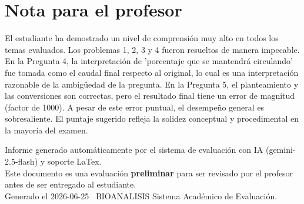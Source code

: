 \documentclass[11pt,a4paper]{article}
\begin{document}
\section*{Nota para el profesor}
\begin{tcolorbox}[
  enhanced, breakable,
  colback=yellow!8, colframe=yellow!60!black,
  fonttitle=\bfseries, coltitle=black,
  title={Observaciones para revisión manual},
  top=4pt, bottom=4pt, left=8pt, right=8pt,
]
El estudiante ha demostrado un nivel de comprensión muy alto en todos los temas evaluados. Los problemas 1, 2, 3 y 4 fueron resueltos de manera impecable. En la Pregunta 4, la interpretación de 'porcentaje que se mantendrá circulando' fue tomada como el caudal final respecto al original, lo cual es una interpretación razonable de la ambigüedad de la pregunta. En la Pregunta 5, el planteamiento y las conversiones son correctas, pero el resultado final tiene un error de magnitud (factor de 1000). A pesar de este error puntual, el desempeño general es sobresaliente. El puntaje sugerido refleja la solidez conceptual y procedimental en la mayoría del examen.
\end{tcolorbox}

\vspace{12pt}
\begin{center}
  \footnotesize\color{gray}
  Informe generado automáticamente por el sistema de evaluación con IA (gemini-2.5-flash) y soporte LaTex. \\
  Este documento es una evaluación \textbf{preliminar} para ser revisado por el profesor antes de ser entregado al 
  estudiante. \\
  Generado el 2026-06-25 \textbullet\ BIOANALISIS Sistema Académico de Evaluación.
  \end{center}
\end{document}

